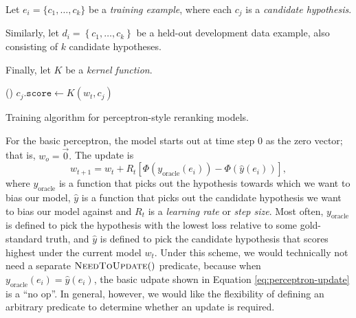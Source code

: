 \documentclass[a4paper]{article}
\begin{document}
\begin{algorithm}
Let $e_{i}=\{c_{1},\ldots,c_{k}\}$ be a \emph{training example},
where each $c_{j}$ is a \emph{candidate hypothesis}.

Similarly, let $d_{i}=\left\{ c_{1},\ldots,c_{k}\right\} $ be a held-out
development data example, also consisting of $k$ candidate hypotheses.

Finally, let $K$ be a \emph{kernel function}.

\renewcommand\algorithmicforall{\textbf{foreach}}
\begin{algorithmic}
    \State {}
    \State {}
  \EndWhile
\EndProcedure
\State
{}
    \State {}
      \State {}()
    \EndIf
  \EndFor
\EndProcedure
\State
{}
    \State $c_j.\texttt{score} \leftarrow K(w_t, c_j)$
  \EndFor
\EndProcedure
\end{algorithmic}

\caption{\label{alg:basic-perceptron}Training algorithm for perceptron-style
reranking models.}
\end{algorithm}


For the basic perceptron, the model starts out at time step 0 as the
zero vector; that is, $w_{o}=\vec{0}.$ The update is 
\begin{equation}
w_{t+1}=w_{t}+R_{t}\left[\Phi\left(y_{\mathrm{oracle}}\left(e_{i}\right)\right)-\Phi\left(\hat{y}\left(e_{i}\right)\right)\right],\label{eq:perceptron-update}
\end{equation}
 where $y_{\mathrm{oracle}}$ is a function that picks out the hypothesis
towards which we want to bias our model, $\hat{y}$ is a function
that picks out the candidate hypothesis we want to bias our model
against and $R_{t}$ is a \emph{learning rate} or \emph{step size}.
Most often, $y_{\mathrm{oracle}}$ is defined to pick the hypothesis
with the lowest loss relative to some gold-standard truth, and $\hat{y}$
is defined to pick the candidate hypothesis that scores highest under
the current model $w_{t}$. Under this scheme, we would technically
not need a separate $ $$\Call{NeedToUpdate}{}()$ predicate, because
when $y_{\mathrm{oracle}}\left(e_{i}\right)=\hat{y}\left(e_{i}\right)$,
the basic udpate shown in Equation \ref{eq:perceptron-update} is
a ``no op''. In general, however, we would like the flexibility
of defining an arbitrary predicate to determine whether an update
is required.
\end{document}

